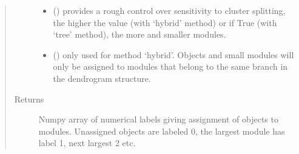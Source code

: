 \documentclass[letterpaper,10pt,english]{sphinxmanual}
\begin{document}
\begin{fulllineitems}
\begin{quote}
\begin{description}
\begin{itemize}
\item {} 
 () \textendash{} provides a rough control over sensitivity to cluster splitting, the higher the value (with ‘hybrid’ method) or if True (with ‘tree’ method), the more and smaller modules.

\item {} 
 () \textendash{} only used for method ‘hybrid’. Objects and small modules will only be assigned to modules that belong to the same branch in the dendrogram structure.

\end{itemize}

\item[{Returns}] \leavevmode
Numpy array of numerical labels giving assignment of objects to modules. Unassigned objects are labeled 0, the largest module has label 1, next largest 2 etc.

\end{description}\end{quote}

\end{fulllineitems}

\end{document}
